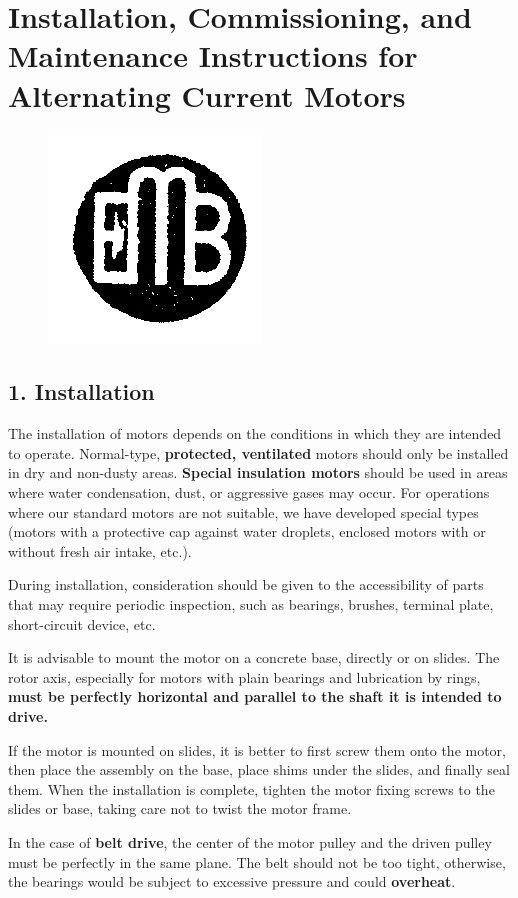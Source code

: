 \chapter{Installation, Commissioning, and Maintenance Instructions for Alternating Current Motors}

\begin{figure}[ht]
    \centering
    \includegraphics[width=0.1\linewidth]{images/page_62_manufacturer_logo}
    \label{fig:alternating_motor_manufacturer_logo}
\end{figure}

{\small

\section*{1. Installation}

The installation of motors depends on the conditions in which they are intended to operate.
Normal-type, \textbf{protected, ventilated} motors should only be installed in dry and non-dusty areas.
\textbf{Special insulation motors} should be used in areas where water condensation, dust, or aggressive gases may occur.
For operations where our standard motors are not suitable, we have developed special types (motors with a protective cap against water droplets,
    enclosed motors with or without fresh air intake, etc.).

During installation, consideration should be given to the accessibility of parts that may require periodic inspection,
    such as bearings, brushes, terminal plate, short-circuit device, etc.

It is advisable to mount the motor on a concrete base, directly or on slides.
The rotor axis, especially for motors with plain bearings and lubrication by rings, \textbf{must be perfectly horizontal and parallel to the shaft it is intended to drive.}

If the motor is mounted on slides, it is better to first screw them onto the motor, then place the assembly on the base,
    place shims under the slides, and finally seal them.
When the installation is complete, tighten the motor fixing screws to the slides or base, taking care not to twist the motor frame.

In the case of \textbf{belt drive}, the center of the motor pulley and the driven pulley must be perfectly in the same plane.
The belt should not be too tight, otherwise, the bearings would be subject to excessive pressure and could \textbf{overheat}.

}

